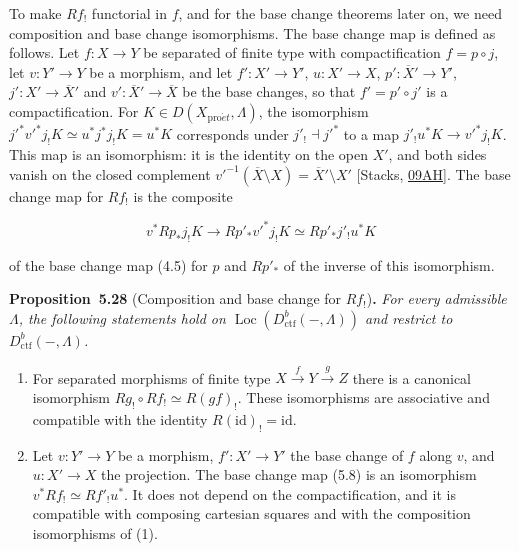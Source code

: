 \documentclass[11pt]{article}
\newenvironment{bpstatement}[2]{\par\addvspace{0.6\baselineskip}\noindent\textbf{#1}#2\textbf{.}\enspace\ignorespaces}
  {\par\addvspace{0.4\baselineskip}}
\newenvironment{bpstatementit}[2]{\begin{bpstatement}{#1}{#2}\itshape\ignorespaces}{\end{bpstatement}}
\providecommand{\Loc}{}\renewcommand{\Loc}{\operatorname{Loc}}
\begin{document}
\label{bp89}%
To make \(Rf_!\) functorial in \(f\), and for the base change theorems later on, we need composition and base change isomorphisms. The base change map is defined as follows. Let \(f:X\to Y\) be separated of finite type with compactification \(f=p\circ j\), let \(v:Y'\to Y\) be a morphism, and let \(f':X'\to Y'\), \(u:X'\to X\), \(p':\overline X'\to Y'\), \(j':X'\to\overline X'\) and \(v':\overline X'\to\overline X\) be the base changes, so that \(f'=p'\circ j'\) is a compactification. For \(K\in D(X_{\mathrm{pro}\acute{e}t},\Lambda)\), the isomorphism \(j'^*v'^*j_!K\simeq u^*j^*j_!K=u^*K\) corresponds under \(j'_!\dashv j'^*\) to a map \(j'_!u^*K\to v'^*j_!K\). This map is an isomorphism: it is the identity on the open \(X'\), and both sides vanish on the closed complement \(v'^{-1}(\overline X\setminus X)=\overline X'\setminus X'\) [Stacks, \href{https://stacks.math.columbia.edu/tag/09AH}{09AH}]. The base change map for \(Rf_!\) is the composite

\[
v^*Rp_*j_!K\longrightarrow Rp'_*v'^*j_!K\simeq Rp'_*j'_!u^*K
\tag{5.8}
\]

of the base change map (4.5) for \(p\) and \(Rp'_*\) of the inverse of this isomorphism.

\label{bp90}%
\begin{bpstatementit}{Proposition~5.28}{ (Composition and base change for $Rf_!$)}
For every admissible \(\Lambda\), the following statements hold on \(\Loc(D^b_{\mathrm{ctf}}(-,\Lambda))\) and restrict to \(D^b_{\mathrm{ctf}}(-,\Lambda)\).

\begin{enumerate}
\item For separated morphisms of finite type \(X\xrightarrow fY
  \xrightarrow gZ\) there is a canonical isomorphism \(Rg_!\circ Rf_!\simeq R(gf)_!\). These isomorphisms are associative and compatible with the identity \(R(\mathrm{id})_!=\mathrm{id}\).
\item Let \(v:Y'\to Y\) be a morphism, \(f':X'\to Y'\) the base change of \(f\) along \(v\), and \(u:X'\to X\) the projection. The base change map (5.8) is an isomorphism \(v^*Rf_!\simeq Rf'_!u^*\). It does not depend on the compactification, and it is compatible with composing cartesian squares and with the composition isomorphisms of (1).
\end{enumerate}
\end{bpstatementit}
\end{document}
